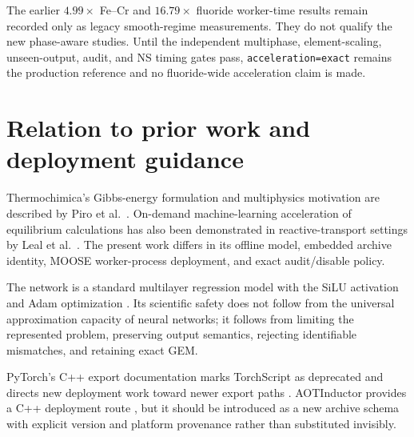 \documentclass[11pt]{article}
\newcommand{\code}[1]{\texttt{#1}}
\begin{document}
The earlier \(4.99\times\) Fe--Cr and \(16.79\times\) fluoride worker-time results remain recorded
only as legacy smooth-regime measurements.  They do not qualify the new phase-aware studies.
Until the independent multiphase, element-scaling, unseen-output, audit, and NS timing gates pass,
\code{acceleration=exact} remains the production reference and no fluoride-wide acceleration claim
is made.

\section{Relation to prior work and deployment guidance}

Thermochimica's Gibbs-energy formulation and multiphysics motivation are described by Piro
et al.~\cite{piro2013}.  On-demand machine-learning acceleration of equilibrium calculations has
also been demonstrated in reactive-transport settings by Leal et al.~\cite{leal2020}.  The present
work differs in its offline model, embedded archive identity, MOOSE worker-process deployment, and
exact audit/disable policy.

The network is a standard multilayer regression model with the SiLU activation
\cite{elfwing2018} and Adam optimization \cite{kingma2015}.  Its scientific safety does not follow
from the universal approximation capacity of neural networks; it follows from limiting the
represented problem, preserving output semantics, rejecting identifiable mismatches, and retaining
exact GEM.

PyTorch's C++ export documentation marks TorchScript as deprecated and directs new deployment work
toward newer export paths \cite{torchscript}.  AOTInductor provides a C++ deployment route
\cite{aotinductor}, but it should be introduced as a new archive schema with explicit version and
platform provenance rather than substituted invisibly.
\end{document}
